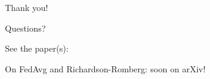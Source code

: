 \documentclass[aspectratio=169,14pt]{beamer}
\begin{document}
  \begin{frame}
    \begin{center}
      \LARGE Thank you!

      \normalsize Questions?
    \end{center}
    

    \small
    See the paper(s):


    On FedAvg and Richardson-Romberg: soon on arXiv!
  \end{frame}
\end{document}

